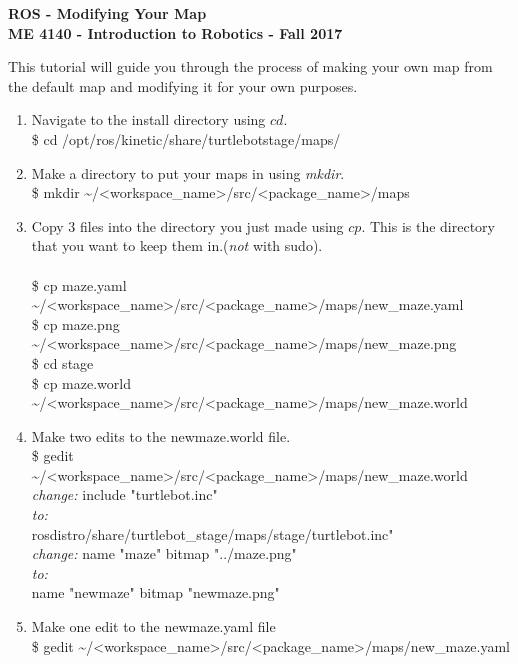 \documentclass[12pt]{article}
\newcommand{\R}{\color{red}}
\newcommand{\K}{\color{black}}
\newcommand{\G}{\color{mygreen}}
\newcommand{\pkgname}{\G<package\_name>\K}
\newcommand{\wspname}{\R<workspace\_name>\K}
\newcommand{\home}{\textasciitilde/}
\newcommand{\rosdistro}{kinetic}
\begin{document}
\thispagestyle{plain}

\begin{center}
   {\bf \Large ROS - Modifying Your Map }\vspace{2mm} \\
   {\bf \large ME 4140 - Introduction to Robotics - Fall 2017} \\
\end{center}

This tutorial will guide you through the process of making your own map from the default map and modifying it for your own purposes. \\

\begin{enumerate}
    \item Navigate to the install directory using $cd$. \vspace{4mm}\\   
        {\selectfont
        \$ cd /opt/ros/\rosdistro/share/turtlebot\textunderscore stage/maps/} 
    \item Make a directory to put your maps in using {\it mkdir}.\vspace{4mm}\\
         {\selectfont \$ mkdir \home\wspname/src/\pkgname/maps} 
    
    \item Copy 3 files into the directory you just made using $cp$. This is the directory that you want to keep them in.({\it not} with sudo).\\ \vspace{1mm}\\
        {\selectfont    
        \$ cp maze.yaml \home\wspname/src/\pkgname/maps/new\_maze.yaml \\
        \$ cp maze.png \home\wspname/src/\pkgname/maps/new\_maze.png \\
        \$ cd stage \\
        \$ cp maze.world \home\wspname/src/\pkgname/maps/new\_maze.world }    
	\item Make two edits to the new\textunderscore maze.world file.\\
	{\selectfont    
        \$ gedit \home\wspname/src/\pkgname/maps/new\_maze.world}\\
        {\it change:}
            {\selectfont
			include "turtlebot.inc" } \\
		{\it to:}
            {\selectfont
			\\rosdistro/share/turtlebot\_stage/maps/stage/turtlebot.inc" } \\
		{\it change:}
            {\selectfont
			name "maze"
		  	bitmap "../maze.png" } \\
		{\it to:}\\
            {\selectfont
			name "new\textunderscore maze"
		  	bitmap "new\textunderscore maze.png" }\\
	\item Make one edit to the new\textunderscore maze.yaml file\\
	{\selectfont    
        \$ gedit \home\wspname/src/\pkgname/maps/new\_maze.yaml}


\end{enumerate}
\end{document}
